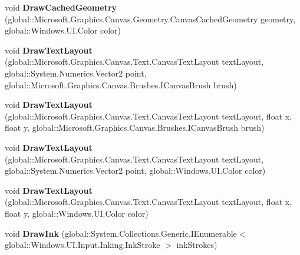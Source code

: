 \begin{DoxyCompactItemize}
void {\bfseries Draw\+Cached\+Geometry} (global\+::\+Microsoft.\+Graphics.\+Canvas.\+Geometry.\+Canvas\+Cached\+Geometry geometry, global\+::\+Windows.\+U\+I.\+Color color)
\item 
\mbox{\label{interface_microsoft_1_1_graphics_1_1_canvas_1_1_i_canvas_drawing_session_a7a501de06ddd18bfa6de42a3ff1974bc}} 
void {\bfseries Draw\+Text\+Layout} (global\+::\+Microsoft.\+Graphics.\+Canvas.\+Text.\+Canvas\+Text\+Layout text\+Layout, global\+::\+System.\+Numerics.\+Vector2 point, global\+::\+Microsoft.\+Graphics.\+Canvas.\+Brushes.\+I\+Canvas\+Brush brush)
\item 
\mbox{\label{interface_microsoft_1_1_graphics_1_1_canvas_1_1_i_canvas_drawing_session_a5fdd3af855c9e0450bfd6f462cf17c8d}} 
void {\bfseries Draw\+Text\+Layout} (global\+::\+Microsoft.\+Graphics.\+Canvas.\+Text.\+Canvas\+Text\+Layout text\+Layout, float x, float y, global\+::\+Microsoft.\+Graphics.\+Canvas.\+Brushes.\+I\+Canvas\+Brush brush)
\item 
\mbox{\label{interface_microsoft_1_1_graphics_1_1_canvas_1_1_i_canvas_drawing_session_adae0184397093ff10c5fbc9e4c3880d3}} 
void {\bfseries Draw\+Text\+Layout} (global\+::\+Microsoft.\+Graphics.\+Canvas.\+Text.\+Canvas\+Text\+Layout text\+Layout, global\+::\+System.\+Numerics.\+Vector2 point, global\+::\+Windows.\+U\+I.\+Color color)
\item 
\mbox{\label{interface_microsoft_1_1_graphics_1_1_canvas_1_1_i_canvas_drawing_session_a98fd13796da376ff0f34ec197798fd1b}} 
void {\bfseries Draw\+Text\+Layout} (global\+::\+Microsoft.\+Graphics.\+Canvas.\+Text.\+Canvas\+Text\+Layout text\+Layout, float x, float y, global\+::\+Windows.\+U\+I.\+Color color)
\item 
\mbox{\label{interface_microsoft_1_1_graphics_1_1_canvas_1_1_i_canvas_drawing_session_acb13ee3d1ee87b78cf2eeabb92ab6c66}} 
void {\bfseries Draw\+Ink} (global\+::\+System.\+Collections.\+Generic.\+I\+Enumerable$<$ global\+::\+Windows.\+U\+I.\+Input.\+Inking.\+Ink\+Stroke $>$ ink\+Strokes)

\end{DoxyCompactItemize}
